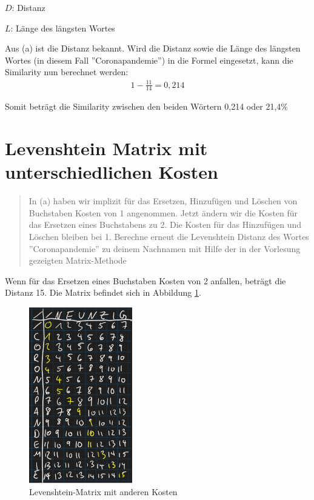 $D$: Distanz

$L$: Länge des längsten Wortes

Aus (a) ist die Distanz bekannt. Wird die Distanz sowie die Länge des längsten Wortes (in diesem Fall ''Coronapandemie'') in die Formel eingesetzt, kann die Similarity nun berechnet werden:
\begin{align*}
    1 - \frac{11}{14} = 0,214
\end{align*}

Somit beträgt die Similarity zwischen den beiden Wörtern 0,214 oder 21,4\%

\section{Levenshtein Matrix mit unterschiedlichen Kosten}
\begin{quote}
    In (a) haben wir implizit für das Ersetzen, Hinzufügen und Löschen von Buchstaben Kosten von 1 angenommen. Jetzt ändern wir die Kosten für das Ersetzen eines Buchstabens zu 2. Die Kosten für das Hinzufügen und Löschen bleiben bei 1. Berechne erneut die Levenshtein Distanz des Wortes ''Coronapandemie'' zu deinem Nachnamen mit Hilfe der in der Vorlesung gezeigten Matrix-Methode
\end{quote}
Wenn für das Ersetzen eines Buchstaben Kosten von 2 anfallen, beträgt die Distanz 15. Die Matrix befindet sich in Abbildung \ref{fig:matrix2}.

\clearpage

\begin{figure}[ht]
	\centering
	\includegraphics[width=0.4\textwidth]{Bilder/MatrixKosten.png} 
	\caption{Levenshtein-Matrix mit anderen Kosten}
	\label{fig:matrix2}
\end{figure}

